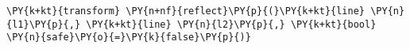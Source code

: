 \begin{Verbatim}[commandchars=\\\{\}]
    \PY{k+kt}{transform} \PY{n+nf}{reflect}\PY{p}{(}\PY{k+kt}{line} \PY{n}{l1}\PY{p}{,} \PY{k+kt}{line} \PY{n}{l2}\PY{p}{,} \PY{k+kt}{bool} \PY{n}{safe}\PY{o}{=}\PY{k}{false}\PY{p}{)}
\end{Verbatim}
